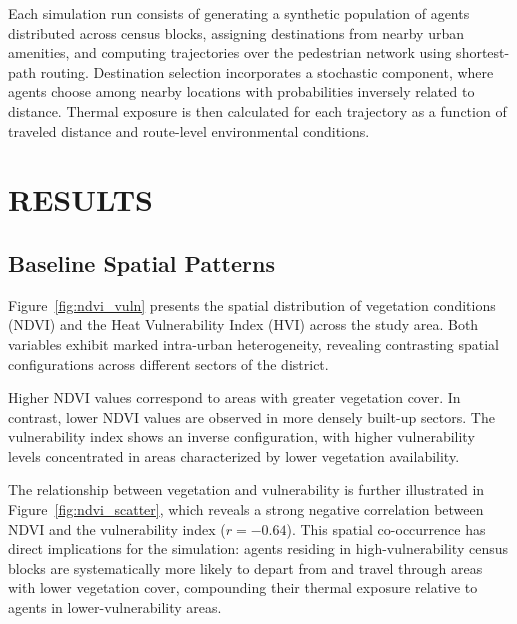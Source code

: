 \documentclass{wscpaperproc}
\theoremstyle{wsc}
\begin{document}
Each simulation run consists of generating a synthetic population of agents distributed across census blocks, assigning destinations from nearby urban amenities, and computing trajectories over the pedestrian network using shortest-path routing. Destination selection incorporates a stochastic component, where agents choose among nearby locations with probabilities inversely related to distance.
Thermal exposure is then calculated for each trajectory as a function of traveled distance and route-level environmental conditions. %


\section{RESULTS}

\subsection{Baseline Spatial Patterns}

Figure~\ref{fig:ndvi_vuln} presents the spatial distribution of vegetation conditions (NDVI) and the Heat Vulnerability Index (HVI) across the study area. Both variables exhibit marked intra-urban heterogeneity, revealing contrasting spatial configurations across different sectors of the district.

Higher NDVI values correspond to areas with greater vegetation cover. In contrast, lower NDVI values are observed in more densely built-up sectors. The vulnerability index shows an inverse configuration, with higher vulnerability levels concentrated in areas characterized by lower vegetation availability.




The relationship between vegetation and vulnerability is further illustrated in Figure~\ref{fig:ndvi_scatter}, which reveals a strong negative correlation between NDVI and the vulnerability index ($r = -0.64$). This spatial co-occurrence has direct implications for the simulation: agents residing in high-vulnerability census blocks are systematically more likely to depart from and travel through areas with lower vegetation cover, compounding their thermal exposure relative to agents in lower-vulnerability areas.
\end{document}
